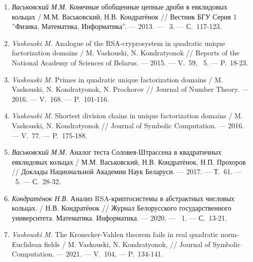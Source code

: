 \begin{enumerate}

    \item \label{source:Vestnik_BSU_2013}
    \textit{Васьковский М.М.} Конечные обобщенные цепные дроби в евклидовых кольцах / М.М. Васьковский, Н.В. Кондратёнок // Вестник БГУ Серия 1 ''Физика, Математика, Информатика''. --- 2013. --- \textnumero~3. --- С.~117-123.

    \item \label{source:NANB_2015}
    \textit{Vaskouski M.} Analogue of the RSA-cryprosystem in quadratic unique facto\-rization domains / M. Vaskouski, N. Kondratyonok // Reports of the National Academy of Sciences of Belarus. --- 2015. --- V.~59, \textnumero~5. --- P.~18-23.

    \item \label{source:JNT_2016}
    \textit{Vaskouski M.} Primes in quadratic unique factorization domains / M. Vaskouski, N. Kondratyonok, N. Prochorov // Journal of Number Theory. --- 2016. --- V.~168. --- P.~101-116.

    \item \label{source:JSC_2016}
    \textit{Vaskouski M.} Shortest division chains in unique factorization domains / M. Vaskouski, N. Kondratyonok // Journal of Symbolic Computation. --- 2016. --- V.~77. --- P.~175-188.

    \item \label{source:NANB_2017}
    \textit{Васьковский М.М.} Аналог теста Соловея-Штрассена в квадратичных евклидовых кольцах / М.М. Васьковский, Н.В. Кондратёнок, Н.П. Прохоров // Доклады Национальной Академии Наук Беларуси. --- 2017. --- Т.~61. --- \textnumero~5. --- С.~28-32.

    \item \label{source:BSU_Journal_2020}
    \textit{Кондратёнок Н.В.} Анализ RSA-криптосистемы в абстрактных числовых кольцах. / Н.В. Кондратёнок // Журнал Белорусского государственного университета. Математика. Информатика. --- 2020. --- \textnumero~1. --- С.~13-21.

    \item \label{source:JSC_2021}
    \textit{Vaskouski M.} The Kronecker-Vahlen theorem fails in real quadratic norm-Eucli\-dean fields / M. Vaskouski, N. Kondratyonok, // Journal of Symbolic Computation. --- 2021. --- V.~104, --- P.~134-141.

\end{enumerate}

\vspace{-4ex}

